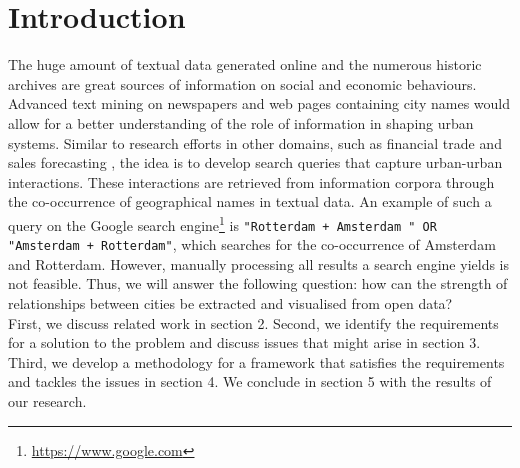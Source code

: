 \newpage
\section{Introduction}


The huge amount of textual data generated online and the numerous historic archives are great sources of information on social and economic behaviours. Advanced text mining on newspapers and web pages containing city names would allow for a better understanding of the role of information in shaping urban systems. Similar to research efforts in other domains, such as financial trade \cite{preis2013quantifying} and sales forecasting \cite{wu2014future}, the idea is to develop search queries that capture urban-urban interactions. These interactions are retrieved from information corpora through the co-occurrence of geographical names in textual data. An example of such a query on the Google search engine\footnote{\url{https://www.google.com}} is \texttt{"Rotterdam + Amsterdam " OR "Amsterdam + Rotterdam"}, which searches for the co-occurrence of Amsterdam and Rotterdam. However, manually processing all results a search engine yields is not feasible. Thus, we will answer the following question: 
how can the strength of relationships between cities be extracted and visualised from open data? \\


First, we discuss related work in section 2. Second, we identify the requirements for a solution to the problem and discuss issues that might arise in section 3. Third, we develop a methodology for a framework that satisfies the requirements and tackles the issues in section 4. We conclude in section 5 with the results of our research.